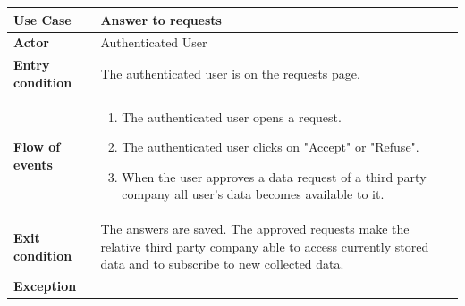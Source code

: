 \documentclass[../main.tex]{subfiles}
\begin{document}
	\vspace*{3cm}
	\begin{center}
		\begin{tabular}{p{3cm}p{8.28cm}}
			\hline
			\textbf{Use Case} & Answer to requests\\
			\hline
			\textbf{Actor} & Authenticated User\\
			\hline
			\textbf{Entry condition} & The authenticated user is on the requests page.\\
			\hline
			\textbf{Flow of events} & \begin{enumerate}
				\linespread{0}\item The authenticated user opens a request.
				\linespread{0}\item The authenticated user clicks on "Accept" or "Refuse".
				\linespread{0}\item When the user approves a data request of a third party company all user's data becomes available to it.
			\end{enumerate}\\
			\hline
			\textbf{Exit condition} & The answers are saved. The approved requests make the relative third party company able to access currently stored data and to subscribe to new collected data.\\
			\hline
			\textbf{Exception}\\
			\hline
		\end{tabular}
	\end{center}
	\vspace*{3cm}
\end{document}
